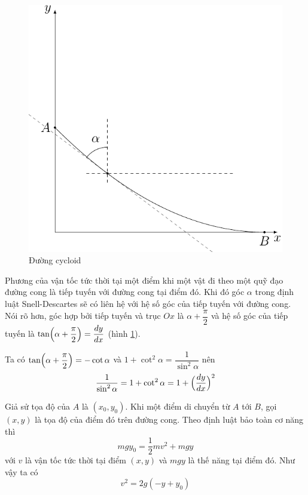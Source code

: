 \documentclass{mynotes}
\theoremstyle{definition}
\begin{document}
\begin{figure}[ht]
    \centering
    \includegraphics{brachistochrone/brachistochrone.pdf}
    \caption{Đường cycloid}
    \label{cycloid:im1}
\end{figure}

Phương của vận tốc tức thời tại một điểm khi một vật đi theo một quỹ đạo đường cong là tiếp tuyến với đường cong tại điểm đó. Khi đó góc $\alpha$ trong định luật Snell-Descartes sẽ có liên hệ với hệ số góc của tiếp tuyến với đường cong. Nói rõ hơn, góc hợp bởi tiếp tuyến và trục $Ox$ là $\alpha + \dfrac{\pi}{2}$ và hệ số góc của tiếp tuyến là $\tan \Bigl(\alpha + \dfrac{\pi}{2}\Bigr) = \dfrac{dy}{dx}$ (hình \ref{cycloid:im1}).

Ta có $\tan \Bigl( \alpha + \dfrac{\pi}{2} \Bigr) = -\cot \alpha$ và $1 + \cot^2 \alpha = \dfrac{1}{\sin^2 \alpha}$ nên 
\begin{equation}
    \dfrac{1}{\sin^2 \alpha} = 1 + \cot^2 \alpha = 1 + \Bigl(\dfrac{dy}{dx}\Bigl)^2
\end{equation}

Giả sử tọa độ của $A$ là $(x_0, y_0)$. Khi một điểm di chuyển từ $A$ tới $B$, gọi $(x, y)$ là tọa độ của điểm đó trên đường cong. Theo định luật bảo toàn cơ năng thì 
\begin{equation*}
    m g y_0 = \frac{1}{2} m v^2 + m g y
\end{equation*}
với $v$ là vận tốc tức thời tại điểm $(x, y)$ và $mgy$ là thế năng tại điểm đó. Như vậy ta có 
\begin{equation}
    v^2 = 2 g (-y + y_0)
\end{equation}
\end{document}
